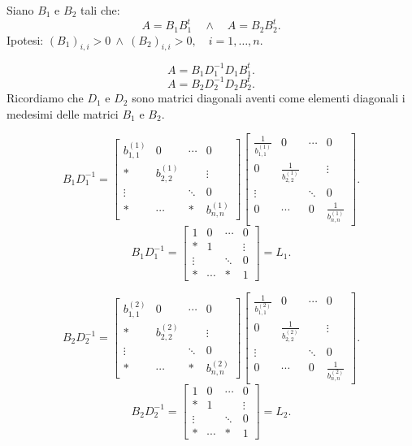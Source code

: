 \begin{dimo}Siano $B_1$ e $B_2$ tali che:
\[A = B_1B_1^t \quad \wedge \quad A = B_2B_2^t.\]
Ipotesi: $(B_1)_{i,i} > 0\ \wedge\ (B_2)_{i,i} > 0, \quad i = 1, \ldots, n$.

\[A = B_1D_1^{-1}D_1B_1^t.\]\[A = B_2D_2^{-1}D_2B_2^t.\]
Ricordiamo che $D_1$ e $D_2$ sono matrici diagonali aventi come elementi
diagonali i medesimi delle matrici $B_1$ e $B_2$.

\[B_1D_1^{-1} =
\left[
\begin{array}{cccc}
b_{1,1}^{(1)} & 0 & \cdots & 0 \\
* & b_{2,2}^{(1)} & & \vdots \\
\vdots & & \ddots & 0 \\
* &\cdots & * & b_{n,n}^{(1)}
\end{array}
\right]
\left[
\begin{array}{cccc}
\frac{1}{b_{1,1}^{(1)}} & 0 & \cdots & 0 \\
0 & \frac{1}{b_{2,2}^{(1)}} & & \vdots \\
\vdots & & \ddots & 0 \\
0 &\cdots & 0 & \frac{1}{b_{n,n}^{(1)}}
\end{array}
\right].
\]
\[B_1D_1^{-1} =
\left[
\begin{array}{cccc}
1 & 0 & \cdots & 0 \\
* & 1 & & \vdots \\
\vdots & & \ddots & 0 \\
* &\cdots & * & 1
\end{array}
\right] = L_1.
\]

\[B_2D_2^{-1} =
\left[
\begin{array}{cccc}
b_{1,1}^{(2)} & 0 & \cdots & 0 \\
* & b_{2,2}^{(2)} & & \vdots \\
\vdots & & \ddots & 0 \\
* &\cdots & * & b_{n,n}^{(2)}
\end{array}
\right]
\left[
\begin{array}{cccc}
\frac{1}{b_{1,1}^{(2)}} & 0 & \cdots & 0 \\
0 & \frac{1}{b_{2,2}^{(2)}} & & \vdots \\
\vdots & & \ddots & 0 \\
0 &\cdots & 0 & \frac{1}{b_{n,n}^{(2)}}
\end{array}
\right].
\]
\[B_2D_2^{-1} =
\left[
\begin{array}{cccc}
1 & 0 & \cdots & 0 \\
* & 1 & & \vdots \\
\vdots & & \ddots & 0 \\
* &\cdots & * & 1
\end{array}
\right] = L_2.\]


\end{dimo}
